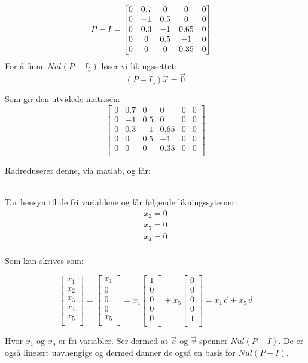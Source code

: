 \documentclass[a4paper, norsk, twoside, 10pt]{article}
\begin{document}
\begin{flushleft}
  \begin{align*}
    P -I &= \begin{bmatrix} 0 & 0.7 & 0 & 0 & 0 \\ 0 & -1 & 0.5 & 0 & 0 \\ 0 & 0.3 & -1 & 0.65 & 0 \\ 0 & 0 & 0.5 & -1 & 0 \\ 0 & 0 & 0 & 0.35 & 0 \\ \end{bmatrix}
  \end{align*}
  For å finne $Nul(P - I_{5})$ løser vi likingssettet:
  \[(P-I_{5}) \vec{x} = \vec{0} \]

  Som gir den utvidede matrisen:
  \[  \begin{bmatrix}
    0 & 0.7 & 0 & 0 & 0 & 0\\
    0 & -1   & 0.5 & 0 & 0 & 0\\
    0 & 0.3 & -1 & 0.65 & 0 & 0\\
    0 & 0   & 0.5 & -1 & 0 & 0\\
    0 & 0 & 0 & 0.35 & 0 & 0\\
  \end{bmatrix}\]

  Radreduserer denne, via matlab, og får:
  
  \ \\
  

  Tar hensyn til de fri variablene og får følgende likningssytemer:
  \begin{align*}
    x_{2} = 0 \\
    x_{3} = 0 \\
    x_{4} = 0 \\
  \end{align*}

  Som kan skrives som:

  \[ \begin{bmatrix}
    x_{1} \\
    x_{2} \\
    x_{3} \\
    x_{4} \\
    x_{5} \\
  \end{bmatrix}
  =
  \begin{bmatrix}
    x_{1} \\
    0 \\
    0 \\
    0 \\
    x_{5}\\
  \end{bmatrix}
    = x_{1}
  \begin{bmatrix}
    1 \\
    0 \\
    0 \\
    0 \\
    0 \\
  \end{bmatrix}
  + x_{5}
  \begin{bmatrix}
    0 \\
    0 \\
    0 \\
    0 \\
    1 \\
  \end{bmatrix}
  = x_{1}\vec{c} + x_{5}\vec{v}
  \]


Hvor $x_{1}$ og $x_{5}$ er fri variabler. Ser dermed at $\vec{c}$ og $\vec{v}$ spenner $Nul(P-I)$. De er også lineært uavhengige og dermed danner de også en basis for $Nul(P-I)$.

\end{flushleft}
\end{document}
